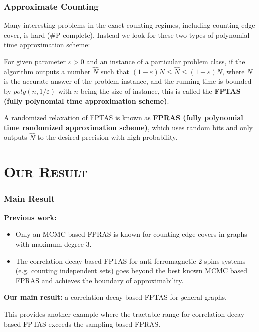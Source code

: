 \documentclass[mathserif]{beamer}
\newcommand{\eps}{\varepsilon}
\begin{document}
\begin{frame}
	\frametitle{Approximate Counting}
	Many interesting problems in the exact counting regimes, including counting edge cover, is hard (\#P-complete).
	Instead we look for these two types of polynomial time approximation scheme:
	\pause
	\begin{definition}[FPTAS]
		For given parameter $\eps > 0$ and an instance of a particular problem class, if the algorithm outputs a number $\hat{N}$ such that $(1-\eps) N \leq \hat{N} \leq (1+\eps) N$, where $N$ is the accurate answer of the problem instance, and the running time is bounded by $poly(n, 1/ \eps)$ with $n$ being the size of instance, this is called the {\bf FPTAS (fully polynomial time approximation scheme)}.

	\end{definition}
	\pause
	\begin{definition}[FPRAS]
		A randomized relaxation of FPTAS is known as {\bf FPRAS (fully polynomial time randomized approximation scheme)}, which uses random bits and only outputs $\hat{N}$ to the desired precision with high probability.
	\end{definition}
\end{frame}

%	


\section{\scshape Our Result}

\begin{frame}
	\frametitle{Main Result}
	{\bf Previous work:}
	\begin{itemize}
		\item Only an MCMC-based FPRAS is known for counting edge covers in graphs with maximum degree $3$.
		\item The correlation decay based FPTAS for anti-ferromagnetic 2-spins systems (e.g. counting independent sets) goes beyond the best known MCMC based FPRAS and achieves the boundary of approximability.
	\end{itemize}

	\pause
	{\bf Our main result:} a correlation decay based FPTAS for {\emph general} graphs.
 
 This provides another example where the tractable range for correlation decay based FPTAS exceeds the sampling based FPRAS.
\end{frame}
\end{document}
